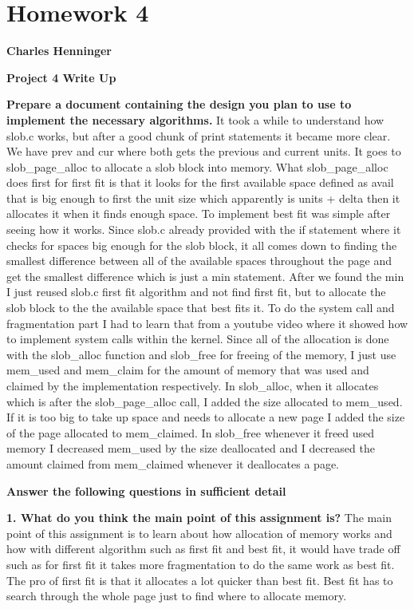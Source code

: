 \documentclass[letterpaper,10pt,titlepage,fleqn]{article}
\begin{document}
\section*{Homework 4}

\textbf{Charles Henninger}

\textbf{Project 4 Write Up}

\textbf{Prepare a document containing the design you plan to use to implement the necessary algorithms.}
	It took a while to understand how slob.c works, but after a good chunk of print statements it became more clear. We have prev and cur where both gets the previous and current units. It goes to slob\_page\_alloc to allocate a slob block into memory. What slob\_page\_alloc does first for first fit is that it looks for the first available space defined as avail that is big enough to first the unit size which apparently is units + delta then it allocates it when it finds enough space. To implement best fit was simple after seeing how it works. Since slob.c already provided with the if statement where it checks for spaces big enough for the slob block, it all comes down to finding the smallest difference between all of the available spaces throughout the page and get the smallest difference which is just a min statement. After we found the min I just reused slob.c first fit algorithm and not find first fit, but to allocate the slob block to the the available space that best fits it. To do the system call and fragmentation part I had to learn that from a youtube video where it showed how to implement system calls within the kernel. Since all of the allocation is done with the slob\_alloc function and  slob\_free for freeing of the memory, I just use mem\_used and mem\_claim for the amount of memory that was used and claimed by the implementation respectively. In slob\_alloc, when it allocates which is after the slob\_page\_alloc call, I added the size allocated to mem\_used. If it is too big to take up space and needs to allocate a new page I added the size of the page allocated to mem\_claimed. In slob\_free whenever it freed used memory I decreased mem\_used by the size deallocated and I decreased the amount claimed from mem\_claimed whenever it deallocates a page.

\textbf{Answer the following questions in sufficient detail}

    \textbf{1. What do you think the main point of this assignment is?}
    The main point of this assignment is to learn about how allocation of memory works and how with different algorithm such as first fit and best fit, it would have trade off such as for first fit it takes more fragmentation to do the same work as best fit. The pro of first fit is that it allocates a lot quicker than best fit. Best fit has to search through the whole page just to find where to allocate memory. 
\end{document}
